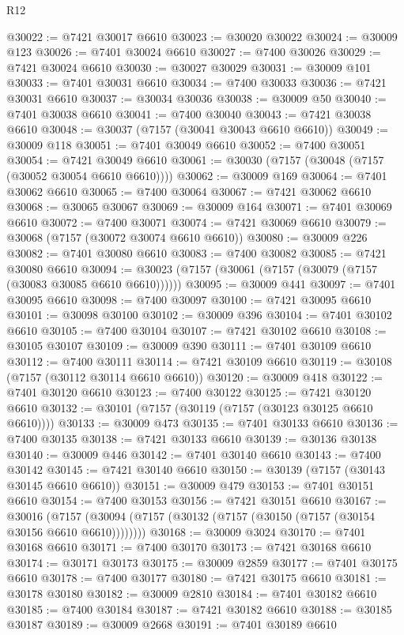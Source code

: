 \begin{lexlean}{R12}
\begin{coremodule}
@30022 := @7421 @30017 @6610
@30023 := @30020 @30022
@30024 := @30009 @123
@30026 := @7401 @30024 @6610
@30027 := @7400 @30026
@30029 := @7421 @30024 @6610
@30030 := @30027 @30029
@30031 := @30009 @101
@30033 := @7401 @30031 @6610
@30034 := @7400 @30033
@30036 := @7421 @30031 @6610
@30037 := @30034 @30036
@30038 := @30009 @50
@30040 := @7401 @30038 @6610
@30041 := @7400 @30040
@30043 := @7421 @30038 @6610
@30048 := @30037 (@7157 (@30041 @30043 @6610 @6610))
@30049 := @30009 @118
@30051 := @7401 @30049 @6610
@30052 := @7400 @30051
@30054 := @7421 @30049 @6610
@30061 := @30030 (@7157 (@30048 (@7157 (@30052 @30054 @6610 @6610))))
@30062 := @30009 @169
@30064 := @7401 @30062 @6610
@30065 := @7400 @30064
@30067 := @7421 @30062 @6610
@30068 := @30065 @30067
@30069 := @30009 @164
@30071 := @7401 @30069 @6610
@30072 := @7400 @30071
@30074 := @7421 @30069 @6610
@30079 := @30068 (@7157 (@30072 @30074 @6610 @6610))
@30080 := @30009 @226
@30082 := @7401 @30080 @6610
@30083 := @7400 @30082
@30085 := @7421 @30080 @6610
@30094 := @30023 (@7157 (@30061 (@7157 (@30079 (@7157 (@30083 @30085 @6610 @6610))))))
@30095 := @30009 @441
@30097 := @7401 @30095 @6610
@30098 := @7400 @30097
@30100 := @7421 @30095 @6610
@30101 := @30098 @30100
@30102 := @30009 @396
@30104 := @7401 @30102 @6610
@30105 := @7400 @30104
@30107 := @7421 @30102 @6610
@30108 := @30105 @30107
@30109 := @30009 @390
@30111 := @7401 @30109 @6610
@30112 := @7400 @30111
@30114 := @7421 @30109 @6610
@30119 := @30108 (@7157 (@30112 @30114 @6610 @6610))
@30120 := @30009 @418
@30122 := @7401 @30120 @6610
@30123 := @7400 @30122
@30125 := @7421 @30120 @6610
@30132 := @30101 (@7157 (@30119 (@7157 (@30123 @30125 @6610 @6610))))
@30133 := @30009 @473
@30135 := @7401 @30133 @6610
@30136 := @7400 @30135
@30138 := @7421 @30133 @6610
@30139 := @30136 @30138
@30140 := @30009 @446
@30142 := @7401 @30140 @6610
@30143 := @7400 @30142
@30145 := @7421 @30140 @6610
@30150 := @30139 (@7157 (@30143 @30145 @6610 @6610))
@30151 := @30009 @479
@30153 := @7401 @30151 @6610
@30154 := @7400 @30153
@30156 := @7421 @30151 @6610
@30167 := @30016
    (@7157 (@30094 (@7157 (@30132 (@7157 (@30150 (@7157 (@30154 @30156 @6610 @6610))))))))
@30168 := @30009 @3024
@30170 := @7401 @30168 @6610
@30171 := @7400 @30170
@30173 := @7421 @30168 @6610
@30174 := @30171 @30173
@30175 := @30009 @2859
@30177 := @7401 @30175 @6610
@30178 := @7400 @30177
@30180 := @7421 @30175 @6610
@30181 := @30178 @30180
@30182 := @30009 @2810
@30184 := @7401 @30182 @6610
@30185 := @7400 @30184
@30187 := @7421 @30182 @6610
@30188 := @30185 @30187
@30189 := @30009 @2668
@30191 := @7401 @30189 @6610

\end{coremodule}
\end{lexlean}
